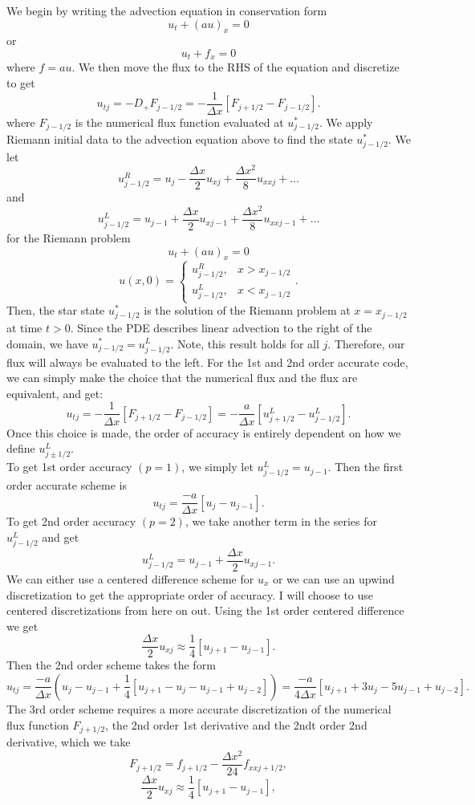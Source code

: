We begin by writing the advection equation in conservation form
$$u_t+(au)_x=0$$
or
$$u_t+f_x=0$$
where $f=au.$ We then move the flux to the RHS of the equation and discretize to get
$$u_{tj}=-D_+F_{j-1/2}=-\frac{1}{\Delta x}[F_{j+1/2}-F_{j-1/2}].$$
where $F_{j-1/2}$ is the numerical flux function evaluated at $u^*_{j-1/2}$. We apply Riemann initial data to the advection equation above to find the state $u^*_{j-1/2}$. We let
$$u^R_{j-1/2}=u_j-\frac{\Delta x}{2}u_{xj}+\frac{\Delta x^2}{8}u_{xxj}+...$$
and
$$u^L_{j-1/2}=u_{j-1}+\frac{\Delta x}{2}u_{xj-1}+\frac{\Delta x^2}{8}u_{xxj-1}+...$$
for the Riemann problem
$$u_t+(au)_x=0$$
$$u(x,0)=\left\{\begin{array}{cc}u^R_{j-1/2},&x>x_{j-1/2}\\ u^L_{j-1/2},&x<x_{j-1/2}\end{array}\right..$$
Then, the star state $u^*_{j-1/2}$ is the solution of the Riemann problem at $x=x_{j-1/2}$ at time $t>0.$ Since the PDE describes linear advection to the right of the domain, we have $u^*_{j-1/2}=u^L_{j-1/2}.$ Note, this result holds for all $j$. Therefore, our flux will always be evaluated to the left. For the 1st and 2nd order accurate code, we can simply make the choice that the numerical flux and the flux are equivalent, and get:
$$u_{tj}=-\frac{1}{\Delta x}[F_{j+1/2}-F_{j-1/2}]=-\frac{a}{\Delta x} [u^L_{j+1/2}-u^L_{j-1/2}].$$
Once this choice is made, the order of accuracy is entirely dependent on how we define $u^L_{j\pm 1/2}.$\\
To get 1st order accuracy $(p=1)$, we simply let $u^L_{j-1/2}=u_{j-1}.$ Then the first order accurate scheme is
$$u_{tj}=\frac{-a}{\Delta x}[u_j-u_{j-1}].$$
To get 2nd order accuracy $(p=2)$, we take another term in the series for $u^L_{j-1/2}$ and get
$$u^L_{j-1/2}=u_{j-1}+\frac{\Delta x}{2}u_{xj-1}.$$
We can either use a centered difference scheme for $u_x$ or we can use an upwind discretization to get the appropriate order of accuracy. I will choose to use centered discretizations from here on out. Using the 1st order centered difference we get
$$\frac{\Delta x}{2}u_{xj}\approx \frac{1}{4}[u_{j+1}-u_{j-1}].$$
Then the 2nd order scheme takes the form
$$u_{tj}=\frac{-a}{\Delta x}(u_j-u_{j-1}+\frac{1}{4}[u_{j+1}-u_j-u_{j-1}+u_{j-2}])=\frac{-a}{4\Delta x}[u_{j+1}+3 u_j-5u_{j-1}+u_{j-2}].$$
The 3rd order scheme requires a more accurate discretization of the numerical flux function $F_{j+1/2}$, the 2nd order 1st derivative and the 2ndt order 2nd derivative, which we take
$$F_{j+1/2}=f_{j+1/2}-\frac{\Delta x^2}{24}f_{xxj+1/2},$$
$$\frac{\Delta x}{2}u_{xj}\approx \frac{1}{4}[u_{j+1}-u_{j-1}],$$
